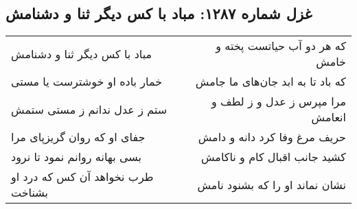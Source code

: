 \begin{center}
\section*{غزل شماره ۱۲۸۷: مباد با کس دیگر ثنا و دشنامش}
\label{sec:1287}
\begin{longtable}{l p{0.5cm} r}
مباد با کس دیگر ثنا و دشنامش
&&
که هر دو آب حیاتست پخته و خامش
\\
خمار باده او خوشترست یا مستی
&&
که باد تا به ابد جان‌های ما جامش
\\
ستم ز عدل ندانم ز مستی ستمش
&&
مرا مپرس ز عدل و ز لطف و انعامش
\\
جفای او که روان گریزپای مرا
&&
حریف مرغ وفا کرد دانه و دامش
\\
بسی بهانه روانم نمود تا نرود
&&
کشید جانب اقبال کام و ناکامش
\\
طرب نخواهد آن کس که درد او بشناخت
&&
نشان نماند او را که بشنود نامش
\\
\end{longtable}
\end{center}
